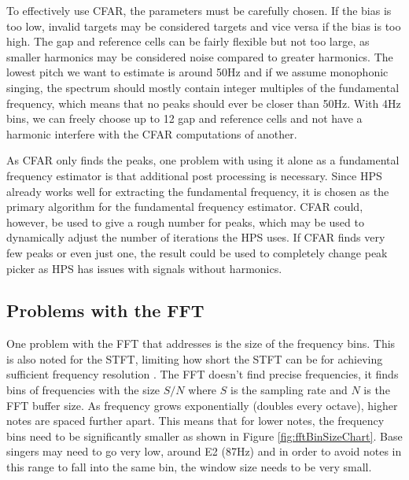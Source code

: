 To effectively use CFAR, the parameters must be carefully chosen. If the bias is too low, invalid targets may be considered targets and vice versa if the bias is too high. The gap and reference cells can be fairly flexible but not too large, as smaller harmonics may be considered noise compared to greater harmonics. The lowest pitch we want to estimate is around 50Hz and if we assume monophonic singing, the spectrum should mostly contain integer multiples of the fundamental frequency, which means that no peaks should ever be closer than 50Hz. With 4Hz bins, we can freely choose up to 12 gap and reference cells and not have a harmonic interfere with the CFAR computations of another.  

As CFAR only finds the peaks, one problem with using it alone as a fundamental frequency estimator is that additional post processing is necessary. Since HPS already works well for extracting the fundamental frequency, it is chosen as the primary algorithm for the fundamental frequency estimator. CFAR could, however, be used to give a rough number for peaks, which may be used to dynamically adjust the number of iterations the HPS uses. If CFAR finds very few peaks or even just one, the result could be used to completely change peak picker as HPS has issues with signals without harmonics.

\subsection{Problems with the FFT}
One problem with the FFT that \cite{Gotsopoulos} addresses is the size of the frequency bins. This is also noted for the STFT, limiting how short the STFT can be for achieving sufficient frequency resolution \cite{Evans2012}. The FFT doesn't find precise frequencies, it finds bins of frequencies with the size $S/N$ where $S$ is the sampling rate and $N$ is the FFT buffer size. As frequency grows exponentially (doubles every octave), higher notes are spaced further apart. This means that for lower notes, the frequency bins need to be significantly smaller as shown in Figure \ref{fig:fftBinSizeChart}. Base singers may need to go very low, around E2 (87Hz) and in order to avoid notes in this range to fall into the same bin, the window size needs to be very small.  

